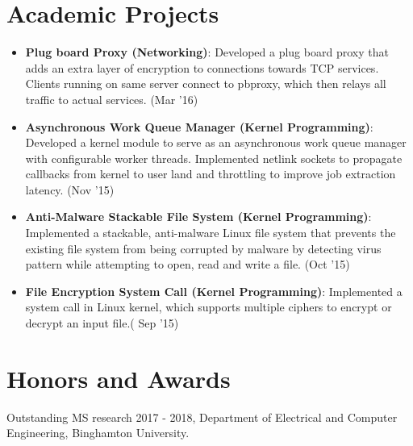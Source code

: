 \documentclass[letterpaper,10.8pt]{article}
\newcommand{\resumeItem}[2]{
  \item\small{
    \textbf{#1}{: #2 \vspace{-2pt}}
  }
}
\newcommand{\resumeSubItem}[2]{\resumeItem{#1}{#2}\vspace{-4pt}}
\newcommand{\resumeSubHeadingListStart}{\begin{itemize}[leftmargin=*]}
\newcommand{\resumeSubHeadingListEnd}{\end{itemize}}
\begin{document}
\section{Academic Projects}
\resumeSubHeadingListStart
\resumeSubItem{Plug board Proxy (Networking)}{Developed a plug board proxy that adds an extra layer of encryption to connections towards TCP services. Clients running on same server connect to pbproxy, which then relays all traffic to actual services. (Mar '16)}
\resumeSubItem{Asynchronous Work Queue Manager (Kernel Programming)}{Developed a kernel module to serve as an asynchronous work queue manager with configurable worker threads. Implemented netlink sockets to propagate callbacks from kernel to user land and throttling to improve job extraction latency. (Nov '15)}
\resumeSubItem{Anti-Malware Stackable File System (Kernel Programming)}{Implemented a stackable, anti-malware Linux file system that prevents the existing file system from being corrupted by malware by detecting virus pattern while attempting to open, read and write a file. (Oct '15)}
\resumeSubItem{File Encryption System Call (Kernel Programming)}{Implemented a system call in Linux kernel, which supports multiple ciphers to encrypt or decrypt an input file.( Sep '15)}
\resumeSubHeadingListEnd

\section{Honors and Awards}
\begin{description}[font=$\bullet$]
\item {Outstanding MS research 2017 - 2018, Department of Electrical and Computer Engineering, Binghamton University.}
\end{description}
\end{document}
